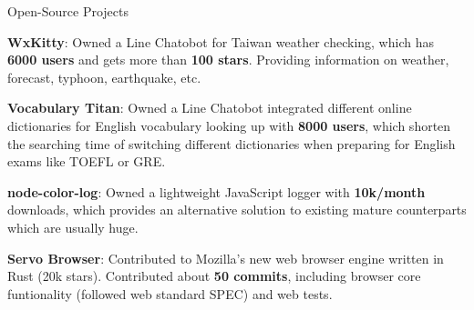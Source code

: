 
\vspace{-2mm}

\begin{cventries}

  \cventry
    {} %
    {Open-Source Projects} %
    {} %
    {} %
    {
      \vspace{-2mm}
      \begin{cvitems} %
        \item {\textbf{WxKitty}: Owned a Line Chatobot for Taiwan weather checking, which has \textbf{6000 users}
          and gets more than \textbf{100 stars}. Providing information on weather, forecast, typhoon, earthquake, etc.
        }
        \item {\textbf{Vocabulary Titan}: Owned a Line Chatobot integrated different online
          dictionaries for English vocabulary looking up
          with \textbf{8000 users}, which shorten the searching time of switching different dictionaries
          when preparing for English exams like TOEFL or GRE.
        }
        \item {\textbf{node-color-log}: Owned a lightweight JavaScript logger with \textbf{10k/month} downloads,
          which provides an alternative solution to existing mature counterparts which are usually huge.
        }
        \item {\textbf{Servo Browser}: Contributed to Mozilla's new web browser engine written in Rust (20k stars).
        Contributed about \textbf{50 commits}, including browser core funtionality (followed web standard SPEC) and web tests.
        }
      \end{cvitems}
    }
  \vspace{-2mm}

\end{cventries}
